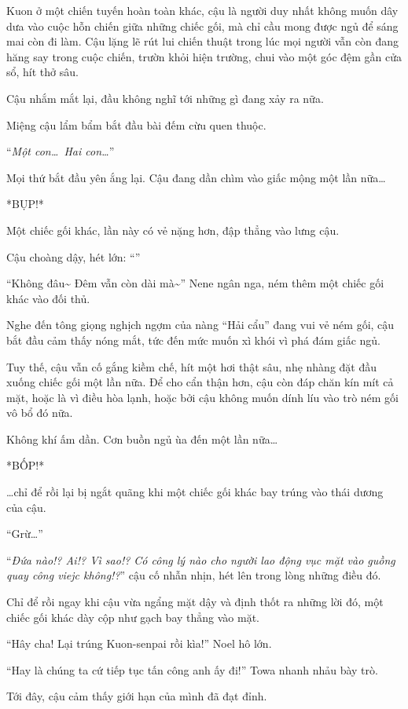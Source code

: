 \documentclass[../main.tex]{subfiles}
\begin{document}
Kuon ở một chiến tuyến hoàn toàn khác, cậu là người duy nhất không muốn dây dưa vào cuộc hỗn chiến giữa những chiếc gối, mà chỉ cầu mong được ngủ để sáng mai còn đi làm. Cậu lặng lẽ rút lui chiến thuật trong lúc mọi người vẫn còn đang hăng say trong cuộc chiến, trườn khỏi hiện trường, chui vào một góc đệm gần cửa sổ, hít thở sâu.

Cậu nhắm mắt lại, đầu không nghĩ tới những gì đang xảy ra nữa.

Miệng cậu lẩm bẩm bắt đầu bài đếm cừu quen thuộc.

``\textit{Một con\dots\ Hai con\dots}''

Mọi thứ bắt đầu yên ắng lại. Cậu đang dần chìm vào giấc mộng một lần nữa\dots

*BỤP!*

Một chiếc gối khác, lần này có vẻ nặng hơn, đập thẳng vào lưng cậu.

Cậu choàng dậy, hét lớn: ``\textbf{}''

``Không đâu\~{} Đêm vẫn còn dài mà\~{}'' Nene ngân nga, ném thêm một chiếc gối khác vào đối thủ.

Nghe đến tông giọng nghịch ngợm của nàng ``Hải cẩu'' đang vui vẻ ném gối, cậu bắt đầu cảm thấy nóng mắt, tức đến mức muốn xì khói vì phá đám giấc ngủ.

Tuy thế, cậu vẫn cố gắng kiềm chế, hít một hơi thật sâu, nhẹ nhàng đặt đầu xuống chiếc gối một lần nữa. Để cho cẩn thận hơn, cậu còn đáp chăn kín mít cả mặt, hoặc là vì điều hòa lạnh, hoặc bởi cậu không muốn dính líu vào trò ném gối vô bổ đó nữa.

Không khí ấm dần. Cơn buồn ngủ ùa đến một lần nữa\dots

*BỐP!*

\dots chỉ để rồi lại bị ngắt quãng khi một chiếc gối khác bay trúng vào thái dương của cậu.

``Grừ\dots''

``\textit{Đứa nào!? Ai!? Vì sao!? Có công lý nào cho người lao động vục mặt vào guồng quay công viejc không!?}'' cậu cố nhẫn nhịn, hét lên trong lòng những điều đó.

Chỉ để rồi ngay khi cậu vừa ngẩng mặt dậy và định thốt ra những lời đó, một chiếc gối khác dày cộp như gạch bay thẳng vào mặt.

``Hây cha! Lại trúng Kuon-senpai rồi kìa!'' Noel hô lớn.

``Hay là chúng ta cứ tiếp tục tấn công anh ấy đi!'' Towa nhanh nhảu bày trò.

Tới đây, cậu cảm thấy giới hạn của mình đã đạt đỉnh.
\end{document}
